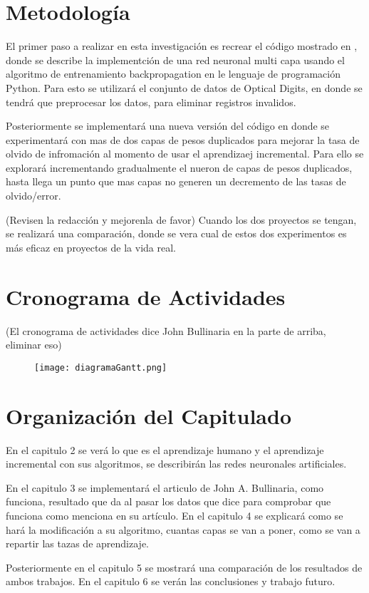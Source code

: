 \section{Metodología}
    El primer paso a realizar en esta investigación es recrear el código mostrado en \cite{Bullinaria2009}, donde se describe la implementción de una red  neuronal multi capa usando el algoritmo de entrenamiento backpropagation en le lenguaje de programación Python.  Para esto se utilizará el conjunto de datos de Optical Digits,  en donde se tendrá que preprocesar los datos, para eliminar registros invalidos. 

    Posteriormente se implementará una nueva versión del código en donde se experimentará con mas de dos capas de pesos duplicados para mejorar la tasa de olvido de infromación al momento de usar el aprendizaej incremental.  Para ello se explorará incrementando gradualmente el nueron de capas de pesos duplicados, hasta llega un punto que mas capas no generen un decremento de las tasas de olvido/error.

(Revisen la redacción y mejorenla de favor)
    Cuando los dos proyectos se tengan, se realizar\'a una comparación, donde se vera cual de estos dos experimentos
    es más eficaz en proyectos de la vida real.
    
\section{Cronograma de Actividades}
(El cronograma de actividades dice John Bullinaria en la parte de arriba, eliminar eso)

    \begin{figure}[H]
        \centering
        \texttt{[image: diagramaGantt.png]}
        \label{fig:fig3}
    \end{figure}

\section{Organización del Capitulado}


	En el capitulo 2 se ver\'a lo que es el aprendizaje humano y el aprendizaje incremental con sus algoritmos, se describirán las redes neuronales artificiales.

En el capitulo 3 se implementar\'a el articulo de John A. Bullinaria, como funciona, resultado que da al pasar los datos que dice para comprobar que funciona como menciona en su art\'iculo. En el capitulo 4 se explicar\'a como se hará la modificación a su algoritmo, cuantas capas se van a poner, como se van a repartir las tazas de aprendizaje.

Posteriormente en el capitulo 5 se mostrar\'a una comparación de los resultados de ambos trabajos. En el capitulo 6 se verán las conclusiones y trabajo futuro.
